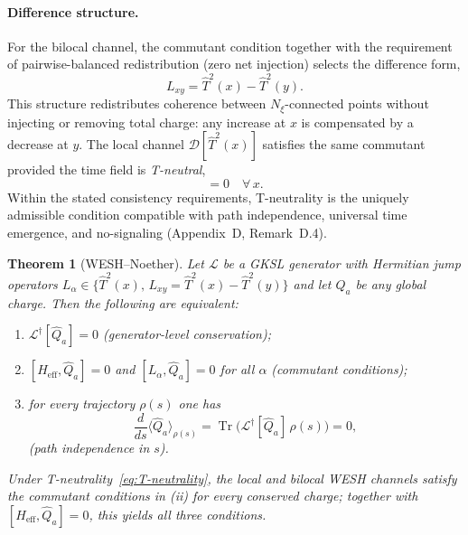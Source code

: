 \documentclass[12pt,a4paper]{article}
\newtheorem{theorem}{Theorem}[section]
\renewcommand{\Tr}{\operatorname{Tr}}
\numberwithin{equation}{section}
\begin{document}
\paragraph{Difference structure.}
For the bilocal channel, the commutant condition together with the requirement 
of pairwise-balanced redistribution (zero net injection) selects the difference form,
\begin{equation}
L_{xy} = \hat{T}^2(x) - \hat{T}^2(y).
\label{eq:difference_Lxy}
\end{equation}
This structure redistributes coherence between $N_\xi$-connected points 
without injecting or removing total charge: any increase at $x$ is 
compensated by a decrease at $y$. The local channel 
$\mathcal{D}[\hat{T}^2(x)]$ satisfies the same commutant provided the 
time field is \emph{T-neutral},
\begin{equation}
[\hat{T}(x), \hat{Q}_{\mathrm{tot}}] = 0 \quad \forall\, x.
\label{eq:T-neutrality}
\end{equation}
Within the stated consistency requirements, T-neutrality is the 
uniquely admissible condition compatible with path independence, 
universal time emergence, and no-signaling (Appendix~D, Remark~D.4).

\begin{theorem}[WESH--Noether]
\label{thm:wesh-noether}
Let $\mathcal{L}$ be a GKSL generator with Hermitian jump operators 
$L_\alpha \in \{\hat{T}^2(x),\, L_{xy} = \hat{T}^2(x) - \hat{T}^2(y)\}$ 
and let $\hat{Q}_a$ be any global charge. Then the following are equivalent:
\begin{enumerate}[label=(\roman*)]
\item $\mathcal{L}^\dagger[\hat{Q}_a] = 0$ \quad (generator-level conservation);
\item $[H_{\mathrm{eff}}, \hat{Q}_a] = 0$ and $[L_\alpha, \hat{Q}_a] = 0$ 
for all $\alpha$ \quad (commutant conditions);
\item for every trajectory $\rho(s)$ one has
\begin{equation}
\frac{d}{ds}\langle\hat{Q}_a\rangle_{\rho(s)} 
= \Tr\bigl(\mathcal{L}^\dagger[\hat{Q}_a]\,\rho(s)\bigr) = 0,
\label{eq:charge-conservation}
\end{equation}
\quad (path independence in $s$).
\end{enumerate}
Under T-neutrality~\eqref{eq:T-neutrality}, the local and bilocal WESH
channels satisfy the commutant conditions in \emph{(ii)} for every conserved
charge; together with $[H_{\mathrm{eff}}, \hat{Q}_a]=0$, this yields all
three conditions.
\end{theorem}
\end{document}
